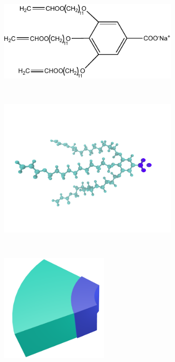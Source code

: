 \documentclass[journal=jpcbfk,manuscript=article]{achemso}
\begin{document}
  \begin{figure}
	\centering
	\begin{subfigure}{.3\textwidth}
		\centering
		\includegraphics[width=\textwidth]{NaGA3C11.pdf}
		\caption{}~\label{fig:monomer}
	\end{subfigure}
	\begin{subfigure}{.3\textwidth}
		\centering
		\includegraphics[width=\textwidth]{monomer_twocolor.pdf}
		\caption{}~\label{fig:atomistic_monomer}
	\end{subfigure}
	\begin{subfigure}{0.3\linewidth}
		\centering
		\includegraphics[width=0.6\textwidth]{wedge_thick.pdf}

\end{subfigure}
\end{figure}
\end{document}
